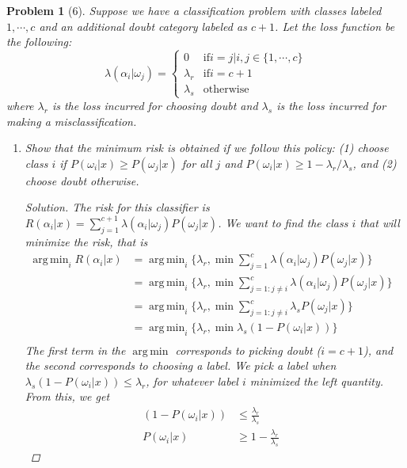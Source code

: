 \documentclass[11pt]{article}
\theoremstyle{quest}
\newtheorem*{problem}{Problem}
\newenvironment{solution}
  {\begin{mdframed}\begin{proof}[Solution]}
  {\end{proof}\end{mdframed}}
\DeclareMathOperator*{\argmin}{arg\,min}
\begin{document}
\begin{problem}[6]
    Suppose we have a classification problem with classes labeled $1,\cdots,c$ and an additional doubt category labeled as $c+1$. Let the loss function be the following:
    \[
     \lambda(\alpha_i | \omega_j) = \begin{cases}
            0  & \text{if} i = j | i,j \in \{1,\cdots,c\} \\
            \lambda_r  & \text{if} i = c + 1 \\
            \lambda_s & \text{otherwise}
            \end{cases}
    \]
    where $\lambda_r$ is the loss incurred for choosing doubt and $\lambda_s$ is the loss incurred for making a misclassification. 
    \begin{enumerate}[label=(\alph*)]
        \item Show that the minimum risk is obtained if we follow this policy: (1) choose class $i$ if $P(\omega_i | x) \ge P(\omega_j | x)$ for all $j$ and $P(\omega_i | x) \ge 1 - \lambda_r / \lambda_s$, and (2) choose doubt otherwise.
            \begin{solution}
            The risk for this classifier is $R(\alpha_i | x) = \sum_{j=1}^{c+1} \lambda(\alpha_i | \omega_j) P(\omega_j | x)$. We want to find the class $i$ that will minimize the risk, that is
            \begin{align*}
                \argmin_i R(\alpha_i|x) &= \argmin_i \{ \lambda_r, \min \sum_{j=1}^{c} \lambda(\alpha_i | \omega_j) P(\omega_j | x)\} &\\
                 &= \argmin_i \{\lambda_r, \min \sum_{j=1 : j \ne i}^{c} \lambda(\alpha_i | \omega_j) P(\omega_j | x)\} &\\
                 &= \argmin_i \{\lambda_r, \min \sum_{j = 1 : j \ne i}^c \lambda_s P(\omega_j | x)\} &\\
                 &= \argmin_i \{\lambda_r, \min \lambda_s (1 - P(\omega_i | x))\} &\\
            \end{align*}
            The first term in the $\argmin$ corresponds to picking doubt ($i = c+1$), and the second corresponds to choosing a label. We pick a label when $\lambda_s (1 - P(\omega_i | x)) \leq \lambda_r$, for whatever label $i$ minimized the left quantity. From this, we get
            \begin{align*}
                (1 - P(\omega_i | x)) &\leq \frac{\lambda_r}{\lambda_s} &\\
                P(\omega_i | x) &\geq 1 - \frac{\lambda_r}{\lambda_s}

\end{align*}
\end{solution}
\end{enumerate}
\end{problem}
\end{document}
